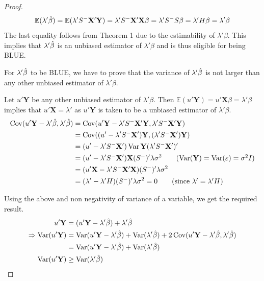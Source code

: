 \documentclass[10pt, a4paper]{article}
\begin{document}
\begin{proof}
	\[ \mathbb{E}(\lambda' \hat{\beta}) = \mathbb{E}(\lambda' S^{-} \mathbf{X}'\mathbf{Y}) = \lambda' S^{-}\mathbf{X}'\mathbf{X}\beta = \lambda' S^{-} S \beta = \lambda' H \beta = \lambda' \beta\]
	The last equality follows from Theorem 1 due to the estimability of \( \lambda' \beta \). This implies that \( \lambda' \hat{\beta} \) is an unbiased estimator of \( \lambda' \beta \) and is thus eligible for being BLUE.

	For \( \lambda' \hat{\beta} \) to be BLUE, we have to prove that the variance of \( \lambda' \hat{\beta} \) is not larger than any other unbiased estimator of \( \lambda' \beta \).

	Let \( u'\mathbf{Y} \) be any other unbiased estimator of \( \lambda' \beta \). Then \( \mathbb{E}(u'\mathbf{Y}) = u'\mathbf{X}\beta = \lambda' \beta \) implies that \( u'\mathbf{X} = \lambda' \) as \( u'\mathbf{Y} \) is taken to be a unbiased estimator of \( \lambda' \beta \).
\begin{align*}
	\Cov(u'\mathbf{Y} - \lambda' \htb, \lambda' \htb) &= \Cov(u'\mathbf{Y} - \lambda' \ginv{S}\mathbf{X}'\mathbf{Y}, \lambda' \ginv{S}\mathbf{X}'\mathbf{Y}) \\
						 &= \Cov((u' - \lambda' \ginv{S}\mathbf{X}')\mathbf{Y}, (\lambda'\ginv{S}\mathbf{X}')\mathbf{Y}) \\
						 &= (u'- \lambda'\ginv{S}\mathbf{X}') \Var{\mathbf{Y}} (\lambda'\ginv{S}\mathbf{X}')' \\
						 &= (u'- \lambda'\ginv{S}\mathbf{X}') \mathbf{X}(\ginv{S})'\lambda \sigma^{2} \tag*{(\( \Var(\mathbf{Y}) = \Var(\mathbf{\varepsilon}) = \sigma^{2}I \))} \\
						 &= (u'\mathbf{X} - \lambda'\ginv{S}\mathbf{X}'\mathbf{X})(\ginv{S})'\lambda \sigma^{2} \\
						 &= (\lambda' - \lambda'H)(\ginv{S})'\lambda \sigma^{2} = 0 \tag*{(since \( \lambda' = \lambda'H \))}
\end{align*}

Using the above and non negativity of variance of a variable, we get the required result.
\begin{align}
u'\mathbf{Y} &= (u'\mathbf{Y} - \lambda' \hat{\beta}) + \lambda' \hat{\beta} \notag \\
\Rightarrow \operatorname{Var}(u'\mathbf{Y}) &= \operatorname{Var}(u'\mathbf{Y} - \lambda' \hat{\beta}) + \operatorname{Var}(\lambda' \hat{\beta}) + 2 \operatorname{Cov}(u'\mathbf{Y} - \lambda' \hat{\beta}, \lambda' \hat{\beta}) \label{var_cov_eq} \\
		   &= \operatorname{Var}(u'\mathbf{Y} - \lambda' \hat{\beta}) + \operatorname{Var}(\lambda' \hat{\beta}) \notag \\
\operatorname{Var}(u'\mathbf{Y})  &\geq \operatorname{Var}(\lambda' \hat{\beta}) \label{var_geq_eq} 
\end{align}
\end{proof}
\end{document}
